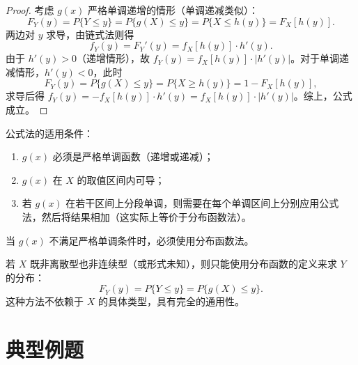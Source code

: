 ﻿\documentclass[lang=cn,11pt]{elegantbook}
\begin{document}
\begin{proof}
考虑 $g(x)$ 严格单调递增的情形（单调递减类似）：
\[
F_Y(y) = P\{Y \le y\} = P\{g(X) \le y\} = P\{X \le h(y)\} = F_X[h(y)].
\]
两边对 $y$ 求导，由链式法则得
\[
f_Y(y) = F_Y'(y) = f_X[h(y)] \cdot h'(y).
\]
由于 $h'(y) > 0$（递增情形），故 $f_Y(y) = f_X[h(y)] \cdot |h'(y)|$。对于单调递减情形，$h'(y) < 0$，此时
\[
F_Y(y) = P\{g(X) \le y\} = P\{X \ge h(y)\} = 1 - F_X[h(y)],
\]
求导后得 $f_Y(y) = -f_X[h(y)] \cdot h'(y) = f_X[h(y)] \cdot |h'(y)|$。综上，公式成立。
\end{proof}

\begin{remark}
公式法的适用条件：
\begin{enumerate}
    \item $g(x)$ 必须是严格单调函数（递增或递减）；
    \item $g(x)$ 在 $X$ 的取值区间内可导；
    \item 若 $g(x)$ 在若干区间上分段单调，则需要在每个单调区间上分别应用公式法，然后将结果相加（这实际上等价于分布函数法）。
\end{enumerate}
当 $g(x)$ 不满足严格单调条件时，必须使用分布函数法。
\end{remark}


\begin{note}若 $X$ 既非离散型也非连续型（或形式未知），则只能使用分布函数的定义来求 $Y$ 的分布：
\[
F_Y(y) = P\{Y \le y\} = P\{g(X) \le y\}.
\]
这种方法不依赖于 $X$ 的具体类型，具有完全的通用性。
\end{note}

\section{典型例题}
\end{document}
